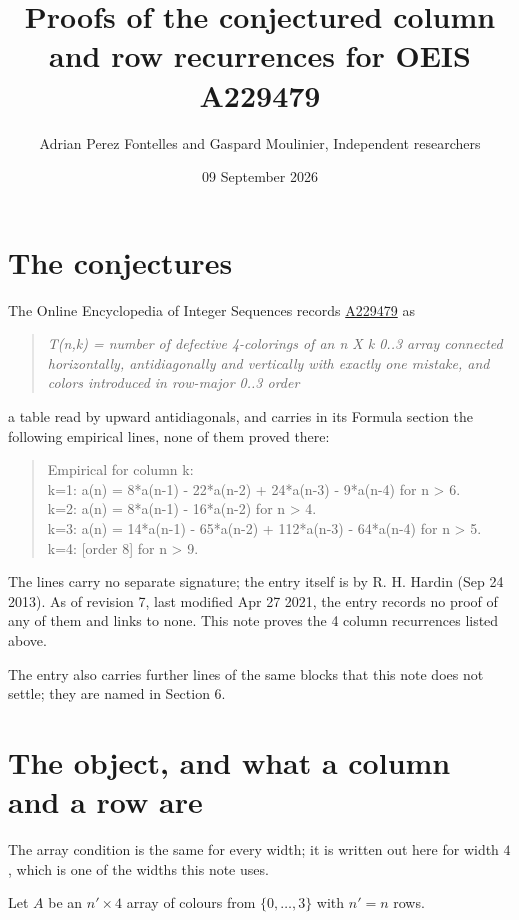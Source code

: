 \documentclass[11pt]{article}
\title{Proofs of the conjectured column and row recurrences for OEIS A229479}
\author{Adrian Perez Fontelles and Gaspard Moulinier, Independent researchers}
\date{09 September 2026}
\theoremstyle{definition}
\begin{document}
\maketitle
\section{The conjectures}

The Online Encyclopedia of Integer Sequences records \href{https://oeis.org/A229479}{A229479} as

\begin{quote}\itshape T(n,k) = number of defective 4-colorings of an n X k 0..3 array connected horizontally, antidiagonally and vertically with exactly one mistake, and colors introduced in row-major 0..3 order\end{quote}

a table read by upward antidiagonals, and carries in its Formula section the following empirical lines, none of them proved there:

\begin{quote}\ttfamily Empirical for column k:\\
k=1: a(n) = 8*a(n-1) - 22*a(n-2) + 24*a(n-3) - 9*a(n-4) for n > 6.\\k=2: a(n) = 8*a(n-1) - 16*a(n-2) for n > 4.\\k=3: a(n) = 14*a(n-1) - 65*a(n-2) + 112*a(n-3) - 64*a(n-4) for n > 5.\\k=4: [order 8] for n > 9.\end{quote}

The lines carry no separate signature; the entry itself is by R. H. Hardin (Sep 24 2013). As of revision 7, last modified Apr 27 2021, the entry records no proof of any of them and links to none. This note proves the 4 column recurrences listed above.

The entry also carries further lines of the same blocks that this note does not settle; they are named in Section 6.

\section{The object, and what a column and a row are}

The array condition is the same for every width; it is written out here for width $4$, which is one of the widths this note uses.

Let $A$ be an $n' \times 4$ array of colours from $\{0,\dots,3\}$ with $n' = n$ rows.
\end{document}
